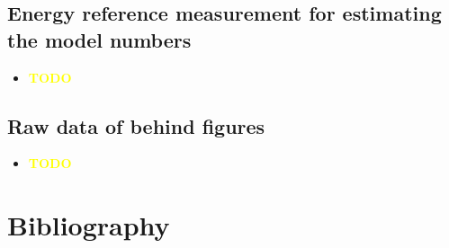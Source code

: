 \documentclass[a4paper, 10pt]{article}
\def \todo{\textbf{\textcolor{yellow}{TODO}}}
\begin{document}
\subsection{Energy reference measurement for estimating the model numbers}
\label{ssec:energy-measurement}
\begin{itemize}
    \item \todo
\end{itemize}

\subsection{Raw data of behind figures}
\begin{itemize}
	\item \todo
\end{itemize}

\pagebreak
\section{Bibliography}
\label{sec:bibliography}
\renewcommand\refname{\vskip -1cm} %
\nocite{*} %

{}
\end{document}
